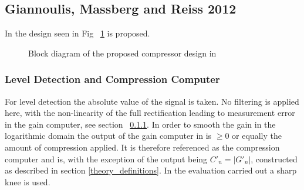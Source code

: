 \documentclass[../main2.tex]{subfiles}
\providecommand{\rootdir}{..}
\begin{document}
\subsection{Giannoulis, Massberg and Reiss 2012}
In \cite{reiss2012tutorial} the design seen in Fig ~\ref{fig:block_reiss_theory} is proposed.
\begin{figure}
\centerline{}
\caption{Block diagram of the proposed compressor design in \cite{reiss2012tutorial}}
\label{fig:block_reiss_theory}
\end{figure}
\subsubsection{Level Detection and Compression Computer}
For level detection the absolute value of the signal is taken. No filtering is applied here, with the non-linearity of the full rectification leading to measurement error in the gain computer, see section ~\ref{}. In order to smooth the gain in the logarithmic domain the output of the gain computer in \cite{reiss2012tutorial} is $\geq 0$ or equally the amount of compression applied. It is therefore referenced as the compression computer and is, with the exception of the output being $C'_n = |G'_n|$, constructed as described in section \ref{theory_definitions}. In the evaluation carried out a sharp knee is used. 
\end{document}
